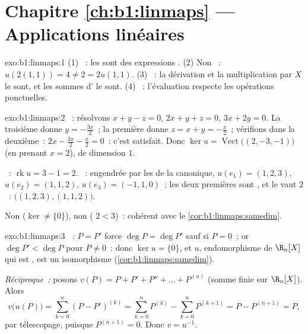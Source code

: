 \section*{Chapitre \ref{ch:b1:linmaps} --- Applications linéaires}

\begin{solution}{exo:b1:linmaps:1}
(1) ~: les  sont des expressions . (2) Non ~:
$u(2(1,1)) = 4 \neq 2 = 2u(1,1)$. (3) ~: la dérivation et la
multiplication par $X$ le sont, et les sommes d' le sont. (4) ~:
l'évaluation respecte les opérations ponctuelles.
\end{solution}

\begin{solution}{exo:b1:linmaps:2}
~: résolvons $x + y - z = 0$, $2x + y + z = 0$, $3x + 2y = 0$.
La troisième donne $y = -\frac{3x}{2}$~; la première donne $z = x + y =
-\frac x2$~; vérifions dans la deuxième~: $2x - \frac{3x}{2} - \frac x2 = 0$~:
c'est satisfait. Donc $\ker u = \operatorname{Vect}\bigl((2, -3, -1)\bigr)$
(en prenant $x = 2$), de dimension $1$.

~: $\operatorname{rk} u = 3 - 1 = 2$. ~: engendrée par
les  de la  canonique, $u(e_1) = (1,2,3)$, $u(e_2) =
(1,1,2)$, $u(e_3) = (-1,1,0)$~; les deux premières sont , et le 
vaut $2$~:  $\bigl((1,2,3), (1,1,2)\bigr)$.

Non  ($\ker \neq \{0\}$), non  ( $2 < 3$)~:
cohérent avec le \cref{cor:b1:linmaps:samedim}.
\end{solution}

\begin{solution}{exo:b1:linmaps:3}
\emph{~:} $P = P'$ force $\deg P = \deg P'$ sauf si $P = 0$~;
or $\deg P' < \deg P$ pour $P \neq 0$~: donc $\ker u = \{0\}$, et $u$,
endomorphisme  de $\R_n[X]$ qui est , est un
isomorphisme (\cref{cor:b1:linmaps:samedim}).

\emph{Réciproque~:} posons $v(P) = P + P' + P'' + \dots + P^{(n)}$ (somme
finie sur $\R_n[X]$). Alors
\[
v\bigl(u(P)\bigr) = \sum_{k=0}^{n} (P - P')^{(k)}
= \sum_{k=0}^{n} P^{(k)} - \sum_{k=0}^{n} P^{(k+1)}
= P - P^{(n+1)} = P ,
\]
par télescopage, puisque $P^{(n+1)} = 0$. Donc $v = u^{-1}$.
\end{solution}

